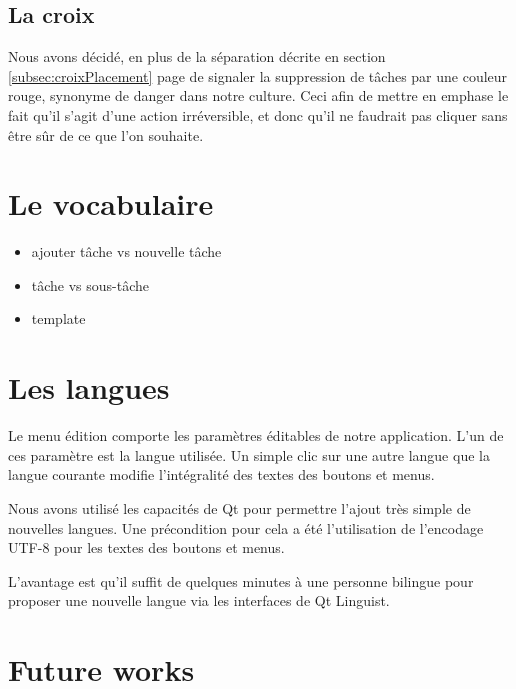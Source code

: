 \documentclass[11pt]{article}
\begin{document}


\subsection{La croix}

Nous avons décidé, en plus de la séparation décrite en section
\ref{subsec:croixPlacement} page \pageref{subsec:croixPlacement} de
signaler la suppression de tâches par une couleur rouge, synonyme de
danger dans notre culture. Ceci afin de mettre en emphase le fait
qu'il s'agit d'une action irréversible, et donc qu'il ne faudrait pas
cliquer sans être sûr de ce que l'on souhaite.


\section{Le vocabulaire}

\begin{itemize}
\item ajouter tâche vs nouvelle tâche
\item tâche vs sous-tâche
\item template
\end{itemize}


\section{Les langues}

Le menu édition comporte les paramètres éditables de notre
application. L'un de ces paramètre est la langue utilisée. Un simple
clic sur une autre langue que la langue courante modifie l'intégralité
des textes des boutons et menus.

Nous avons utilisé les capacités de Qt pour permettre l'ajout très
simple de nouvelles langues. Une précondition pour cela a été
l'utilisation de l'encodage UTF-8 pour les textes des boutons et
menus.

L'avantage est qu'il suffit de quelques minutes à une personne
bilingue pour proposer une nouvelle langue via les interfaces de Qt
Linguist.


\section{Future works}
\label{sec:futureWorks}
\end{document}
